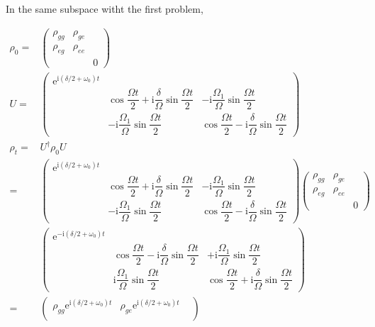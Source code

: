 \documentclass[10pt,fleqn]{article}
\newcommand{\ue}{\mathrm{e}}
\newcommand{\ui}{\mathrm{i}}
\newcommand{\eqar}[1]
{
  \begin{align*}
    #1
  \end{align*}
}
\newcommand{\paren}[1]{{\left({#1}\right)}}
\begin{document}
\subsection{}
In the same subspace witht the first problem,
\eqar{
  \rho_0=&\begin{pmatrix}
    \rho_{gg}&\rho_{ge}\\
    \rho_{eg}&\rho_{ee}\\
    &&0
  \end{pmatrix}\\
  U=&\begin{pmatrix}
    \ue^{\ui\paren{\delta/2+\omega_0}t}&&\\
    &\cos\dfrac{\Omega t}{2}+\ui\dfrac{\delta}{\Omega}\sin\dfrac{\Omega t}{2}&-\ui\dfrac{\Omega_1}{\Omega}\sin\dfrac{\Omega t}{2}\\
    &-\ui\dfrac{\Omega_1}{\Omega}\sin\dfrac{\Omega t}{2}&\cos\dfrac{\Omega t}{2}-\ui\dfrac{\delta}{\Omega}\sin\dfrac{\Omega t}{2}
  \end{pmatrix}\\
  \rho_t=&U^\dagger\rho_0U\\
  =&\begin{pmatrix}
    \ue^{\ui\paren{\delta/2+\omega_0}t}&&\\
    &\cos\dfrac{\Omega t}{2}+\ui\dfrac{\delta}{\Omega}\sin\dfrac{\Omega t}{2}&-\ui\dfrac{\Omega_1}{\Omega}\sin\dfrac{\Omega t}{2}\\
    &-\ui\dfrac{\Omega_1}{\Omega}\sin\dfrac{\Omega t}{2}&\cos\dfrac{\Omega t}{2}-\ui\dfrac{\delta}{\Omega}\sin\dfrac{\Omega t}{2}
  \end{pmatrix}\begin{pmatrix}
    \rho_{gg}&\rho_{ge}\\
    \rho_{eg}&\rho_{ee}\\
    &&0
  \end{pmatrix}\\
  &\begin{pmatrix}
    \ue^{-\ui\paren{\delta/2+\omega_0}t}&&\\
    &\cos\dfrac{\Omega t}{2}-\ui\dfrac{\delta}{\Omega}\sin\dfrac{\Omega t}{2}&+\ui\dfrac{\Omega_1}{\Omega}\sin\dfrac{\Omega t}{2}\\
    &\ui\dfrac{\Omega_1}{\Omega}\sin\dfrac{\Omega t}{2}&\cos\dfrac{\Omega t}{2}+\ui\dfrac{\delta}{\Omega}\sin\dfrac{\Omega t}{2}
  \end{pmatrix}\\
  =&\begin{pmatrix}
    \rho_{gg}\ue^{\ui\paren{\delta/2+\omega_0}t}&\rho_{ge}\ue^{\ui\paren{\delta/2+\omega_0}t}&\\

\end{pmatrix}}
\end{document}
